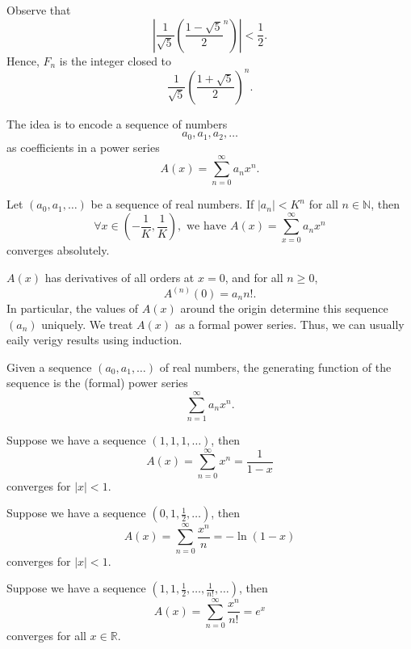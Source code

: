 Observe that 
\[
    \left\vert \frac{1}{\sqrt{5} } \left( \frac{1 - \sqrt{5} }{2}^n \right)  \right\vert < \frac{1}{2} .
\]
Hence, \(F_n\) is the integer closed to 
\[
    \frac{1}{\sqrt{5} } \left( \frac{1 + \sqrt{5} }{2} \right)^n. 
\] 

The idea is to encode a sequence of numbers 
\[
    a_0, a_1, a_2, \dots 
\]
as coefficients in a power series 
\[
    A(x) = \sum_{n=0}^{\infty} a_n x^n. 
\]

\begin{proposition}
    Let \((a_0, a_1, \dots )\) be a sequence of real numbers. If \(\vert a_n \vert < K^n \) for all \(n \in \mathbb{N} \), then
    \[
        \forall x \in \left( -\frac{1}{K}, \frac{1}{K} \right), \text{ we have } A(x) = \sum_{x=0}^{\infty} a_n x^n  
    \]  converges absolutely.
\end{proposition}

\(A(x)\) has derivatives of all orders at \(x = 0\), and for all \(n \ge 0\), 
    \[
        A^{(n)}(0) = a_n n!.
    \]  In particular, the values of \(A(x)\) around the origin determine this sequence \((a_n)\) uniquely. We treat \(A(x)\) as a formal power series.  Thus, we can usually eaily verigy results using induction. 

\begin{definition}
    Given a sequence \((a_0, a_1, \dots )\) of real numbers, the generating function of the sequence is the (formal) power series 
    \[
        \sum_{n=1}^{\infty} a_n x^n.  
    \]
\end{definition}

\begin{eg}
    Suppose we have a sequence \((1, 1, 1, \dots )\), then 
    \[
        A(x) = \sum_{n=0}^{\infty} x^n = \frac{1}{1-x} 
    \] converges for \(\vert x \vert < 1 \).  
\end{eg}

\begin{eg}
    Suppose we have a sequence \(\left( 0, 1, \frac{1}{2}, \dots  \right) \), then 
    \[
        A(x) = \sum_{n=0}^{\infty} \frac{x^n}{n} = -\ln (1 - x) 
    \] converges for \(\vert x \vert < 1 \).  
\end{eg}

\begin{eg}
    Suppose we have a sequence \(\left( 1, 1, \frac{1}{2}, \dots , \frac{1}{n!}, \dots  \right) \), then 
    \[
        A(x) = \sum_{n=0}^{\infty} \frac{x^n}{n!} = e^x
    \] converges for all \(x \in \mathbb{R} \).  
\end{eg}

